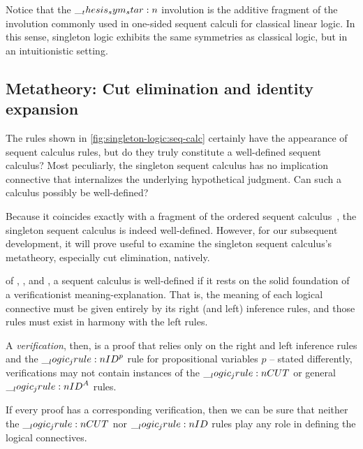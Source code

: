 Notice that the $\sym*{}$ involution is the additive fragment of the involution commonly used in one-sided sequent calculi for classical linear logic.
In this sense, singleton logic exhibits the same symmetries as classical logic, but in an intuitionistic setting.

\subsection{Metatheory: Cut elimination and identity expansion}\label{sec:singleton-logic:seq-calc:metatheory}

The rules shown in \cref{fig:singleton-logic:seq-calc} certainly have the appearance of sequent calculus rules, but do they truly constitute a well-defined sequent calculus?
Most peculiarly, the singleton sequent calculus has no implication connective that internalizes the underlying hypothetical judgment.
Can such a calculus possibly be well-defined?

Because it coincides exactly with a fragment of the ordered sequent calculus~, the singleton sequent calculus is indeed well-defined.
However, for our subsequent development, it will prove useful to examine the singleton sequent calculus's metatheory, especially cut elimination, natively.

 of \citeauthor{Gentzen:MZ35}, \citeauthor{Dummett:WJ76}, and \citeauthor{Martin-Lof:Siena83}\autocites{Gentzen:MZ35}{Dummett:WJ76}{Martin-Lof:Siena83}, a sequent calculus is well-defined if it rests on the solid foundation of a verificationist meaning-explanation.
That is, the meaning of each logical connective must be given entirely by its right (and left) inference rules, and those rules must exist in harmony with the left rules.

A \emph{verification}, then, is a proof that relies only on the right and left inference rules and the $\__logic_jrule:n {ID}^{p}$ rule for propositional variables $p$ -- stated differently, verifications may not contain instances of the $\__logic_jrule:n {CUT}$ or general $\__logic_jrule:n {ID}^A$ rules.

If every proof has a corresponding verification, then we can be sure that neither the $\__logic_jrule:n {CUT}$ nor $\__logic_jrule:n {ID}$ rules play any role in defining the logical connectives.

